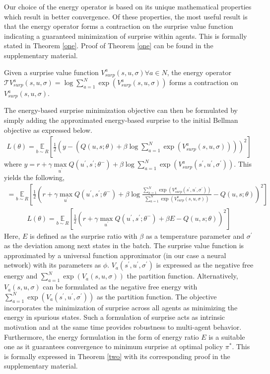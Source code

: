 \documentclass{article}
\begin{document}
\begin{multicols}{2}
Our choice of the energy operator is based on its unique mathematical properties which result in better convergence. Of these properties, the most useful result is that the energy operator forms a contraction on the surprise value function indicating a guaranteed minimization of surprise within agents. This is formally stated in Theorem \autoref{one}. Proof of Theorem \autoref{one} can be found in the supplementary material. %
\begin{customthm}{1}\label{one}
Given a surprise value function $V^{a}_{surp}(s,u,\sigma) \forall a \in N$, the energy operator $\mathcal{T}V^{a}_{surp}(s,u,\sigma)=\log \sum_{a=1}^{N} \exp{(V^{a}_{surp}(s,u,\sigma))}$ forms a contraction on $V^{a}_{surp}(s,u,\sigma)$. 
\end{customthm}
The energy-based surprise minimization objective can then be formulated by simply adding the approximated energy-based surprise to the initial Bellman objective as expressed below.
\begin{equation}
    \begin{aligned}
    L(\theta) = \underset{b \sim R}{\mathbb{E}}[\frac{1}{2}(y - (Q(u,s;\theta) + \beta \log \sum_{a=1}^{N} \exp{(V^{a}_{surp}(s,u,\sigma))}))^{2}] \nonumber
    \end{aligned}
\end{equation}
where $y = r + \gamma \underset{u^{'}}{\max}Q(u^{'},s^{'};\theta^{-}) + \beta \log \sum_{a=1}^{N} \exp{(V^{a}_{surp}(s^{'},u^{'},\sigma^{'}))}$. This yields the following,
\begin{gather*}
     = \underset{b \sim R}{\mathbb{E}}[\frac{1}{2}(r + \gamma \underset{u^{'}}{\max}Q(u^{'},s^{'};\theta^{-}) + \beta \log \frac{\sum_{a=1}^{N} \exp{(V^{a}_{surp}(s^{'},u^{'},\sigma^{'}))}}{\sum_{a=1}^{N} \exp{(V^{a}_{surp}(s,u,\sigma))}} - Q(u,s;\theta))^{2}]
\end{gather*}
\begin{gather}
    L(\theta) = \underset{b \sim R}{\mathbb{E}}[\frac{1}{2}(r + \gamma \underset{u^{'}}{\max}Q(u^{'},s^{'};\theta^{-}) + \beta E - Q(u,s;\theta))^{2}] \label{eq:3}
\end{gather}
Here, $E$ is defined as the surprise ratio with $\beta$ as a temperature parameter and $\sigma^{'}$ as the deviation among next states in the batch. The surprise value function is approximated by a universal function approximator (in our case a neural network) with its parameters as $\phi$. $V_{a}(s^{'},u^{'},\sigma^{'})$ is expressed as the negative free energy and $\sum_{a=1}^{N} \exp{(V_{a}(s,u,\sigma))}$ the partition function. Alternatively, $V_{a}(s,u,\sigma)$ can be formulated as the negative free energy with $\sum_{a=1}^{N} \exp{(V_{a}(s^{'},u^{'},\sigma^{'}))}$ as the partition function. The objective incorporates the minimization of surprise across all agents as minimizing the energy in spurious states. Such a formulation of surprise acts as intrinsic motivation and at the same time provides robustness to multi-agent behavior. Furthermore, the energy formulation in the form of energy ratio $E$ is a suitable one as it guarantees convergence to minimum surprise at optimal policy $\pi^{*}$. This is formally expressed in Theorem \autoref{two} with its corresponding proof in the supplementary material.

\end{multicols}
\end{document}
